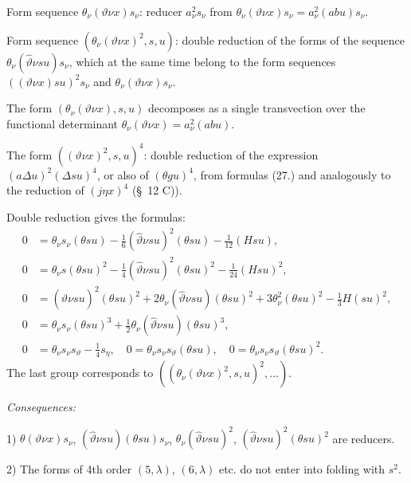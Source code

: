 \documentclass[11pt]{article}
\newcommand{\A}{\Delta}
\begin{document}
Form sequence $\theta_\nu(\vartheta\nu x)s_\nu$: reducer $a_\nu^2s_\nu$ from $\theta_\nu(\vartheta\nu x)s_\nu=a_\nu^2(abu)s_\nu$.

Form sequence $(\theta_\nu(\vartheta\nu x)^2,s,u)$: double reduction of the forms of the sequence $\theta_\nu(\widehat\vartheta\nu su)s_\nu$, which at the same time belong to the form sequences $((\vartheta\nu x)su)^2s_\nu$ and $\theta_\nu(\vartheta\nu x)s_\nu$.

The form $(\theta_\nu(\vartheta\nu x),s,u)$ decomposes as a single transvection over the functional determinant $\theta_\nu(\vartheta\nu x)=a_\nu^2(abu)$.

The form $((\vartheta\nu x)^2,s,u)^4$: double reduction of the expression $(a\A u)^2(\A su)^4$, or also of $(\theta gu)^4$, from formulas (27.) and analogously to the reduction of $(j\eta x)^4$ (\S\ 12 C)).

Double reduction gives the formulas:
\[
\tag{28}
\begin{aligned}
0&=\theta_\nu s_\nu(\theta su)-\frac16(\widehat\vartheta\nu su)^2(\theta su)-\frac1{12}(Hsu),\\
0&=\theta_\nu s(\theta su)^2-\frac14(\widehat\vartheta\nu su)^2(\theta su)^2-\frac1{24}(Hsu)^2,\\
0&=(\widehat\vartheta\nu su)^2(\theta su)^2+2\theta_\nu(\widehat\vartheta\nu su)(\theta su)^2
  +3\theta_\nu^2(\theta su)^2-\frac13H(su)^2,\\
0&=\theta_\nu s_\nu(\theta su)^3+\frac12\theta_\nu(\widehat\vartheta\nu su)(\theta su)^3,\\
0&=\theta_\nu s_\nu s_\vartheta-\frac14s_\eta,
\quad 0=\theta_\nu s_\nu s_\vartheta(\theta su),
\quad 0=\theta_\nu s_\nu s_\vartheta(\theta su)^2.
\end{aligned}
\]
The last group corresponds to $((\theta_\nu(\vartheta\nu x)^2,s,u)^2,\ldots)$.

\noindent\emph{Consequences:}

1) $\theta(\vartheta\nu x)s_\nu$, $(\widehat\vartheta\nu su)(\theta su)s_\nu$, $\theta_\nu(\widehat\vartheta\nu su)^2$, $(\widehat\vartheta\nu su)^2(\theta su)^2$ are reducers.

2) The forms of 4th order $(5,\lambda)$, $(6,\lambda)$ etc. do not enter into folding with $s^2$.
\end{document}
